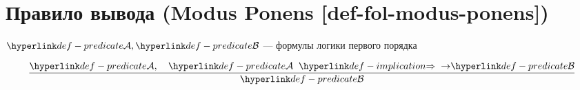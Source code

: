 
\section{Правило вывода (Modus Ponens [def-fol-modus-ponens])}

\hypertarget{def-fol-modus-ponens}{}
\begin{definition}
\label{entity:def-fol-modus-ponens}
$\Predicate{\mathcal{A}}, \Predicate{\mathcal{B}}$ --- формулы логики первого порядка

\[
\frac{\Predicate{\mathcal{A}}, \quad \Predicate{\mathcal{A}} \TermImplication{\to} \Predicate{\mathcal{B}}}{\Predicate{\mathcal{B}}}
\]
\end{definition}